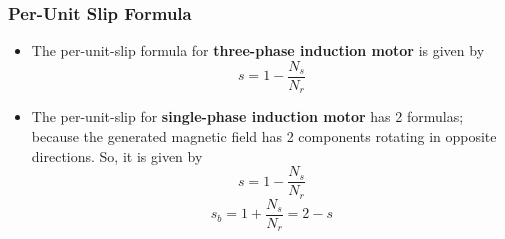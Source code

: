 \documentclass[journal]{IEEEtran}
\begin{document}
\subsubsection{Per-Unit Slip Formula}
\begin{itemize}
    \item The per-unit-slip formula\cite{tamer} for \textbf{three-phase induction motor} is given by
    \begin{equation}
        s = 1 - \frac{N_s}{N_r}
    \end{equation}
    
    \item The per-unit-slip for \cite{guru2007} \textbf{single-phase induction motor} has 2 formulas; because the generated magnetic field has 2 components rotating in opposite directions. So, it is given by 
    \begin{equation}
        s = 1 - \frac{N_s}{N_r}
    \end{equation} 
    \begin{equation}
        s_b = 1 + \frac{N_s}{N_r} = 2 - s
    \end{equation}
\end{itemize}
\end{document}
